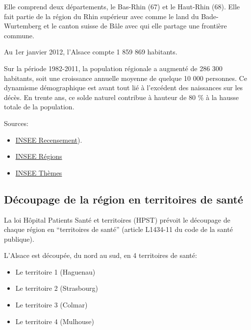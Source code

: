 \documentclass[]{article}
\begin{document}
Elle comprend deux départements, le Bas-Rhin (67) et le Haut-Rhin (68).
Elle fait partie de la région du Rhin supérieur avec comme le land du
Bade-Wurtemberg et le canton suisse de Bâle avec qui elle partage une
frontière commune.

Au 1er janvier 2012, l'Alsace compte 1 859 869 habitants.

Sur la période 1982-2011, la population régionale a augmenté de 286 300
habitants, soit une croissance annuelle moyenne de quelque 10 000
personnes. Ce dynamisme démographique est avant tout lié à l'excédent
des naissances sur les décès. En trente ans, ce solde naturel contribue
à hauteur de 80 \% à la hausse totale de la population.

Sources:

\begin{itemize}
\itemsep1pt\parskip0pt
\item
  \href{http://www.insee.fr/fr/ppp/bases-de-donnees/recensement/populations-legales/france-regions.asp?annee=2012}{INSEE
  Recensement}).
\item
  \href{http://www.insee.fr/fr/regions/alsace/default.asp?page=faitsetchiffres/presentation/presentation.htm}{INSEE
  Régions}
\item
  \href{http://www.insee.fr/fr/themes/document.asp?ref_id=20665}{INSEE
  Thèmes}
\end{itemize}

\subsection{Découpage de la région en territoires de
santé}\label{decoupage-de-la-region-en-territoires-de-sante}

La loi Hôpital Patients Santé et territoires (HPST) prévoit le découpage
de chaque région en ``territoires de santé'' (article L1434-11 du code
de la santé publique).

L'Alsace est découpée, du nord au sud, en 4 territoires de santé:

\begin{itemize}
\itemsep1pt\parskip0pt
\item
  Le territoire 1 (Haguenau)
\item
  Le territoire 2 (Strasbourg)
\item
  Le territoire 3 (Colmar)
\item
  Le territoire 4 (Mulhouse)
\end{itemize}
\end{document}
